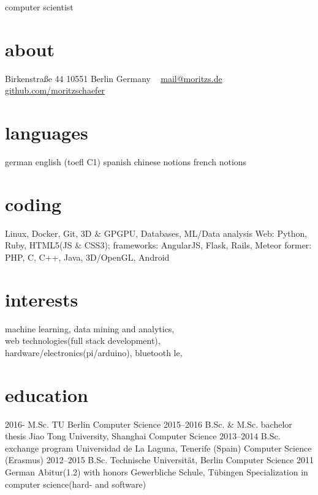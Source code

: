 \documentclass[]{friggeri-cv}
\begin{document}
       {computer scientist}


\begin{aside}
  \section{about}
    Birkenstraße 44
    10551 Berlin
    Germany
    ~
    \href{mailto:mail@moritz.de}{mail@moritzs.de}
    \href{https://github.com/moritzschaefer}{github.com/moritzschaefer}
  \section{languages}
    german
    english (toefl C1)
    spanish
    chinese notions
    french notions
  \section{coding}
    Linux, Docker, Git, 3D \& GPGPU, Databases, ML/Data analysis
    Web:
    Python, Ruby,
    HTML5(JS \& CSS3); frameworks: AngularJS, Flask, Rails, Meteor
    former:
    PHP, C, C++, Java, 3D/OpenGL, Android
\end{aside}

\section{interests}

machine learning, data mining and analytics, \\
web technologies(full stack development), \\
hardware/electronics(pi/arduino), bluetooth le,

\section{education}

\begin{entrylist}
  \entry
    {2016-}
    {M.Sc.}
    {TU Berlin}
    {Computer Science}
  \entry
    {2015–2016}
    {B.Sc. \& M.Sc. bachelor thesis}
    {Jiao Tong University, Shanghai}
    {Computer Science}
  \entry
    {2013–2014}
    {B.Sc. exchange program}
    {Universidad de La Laguna, Tenerife (Spain)}
    {Computer Science (Erasmus)}
  \entry
    {2012–2015}
    {B.Sc.}
    {Technische Universität, Berlin}
    {Computer Science}
  \entry
    {2011}
    {German Abitur(1.2) with honors}
    {Gewerbliche Schule, Tübingen}
    {Specialization in computer science(hard- and software)}
\end{entrylist}
\end{document}
